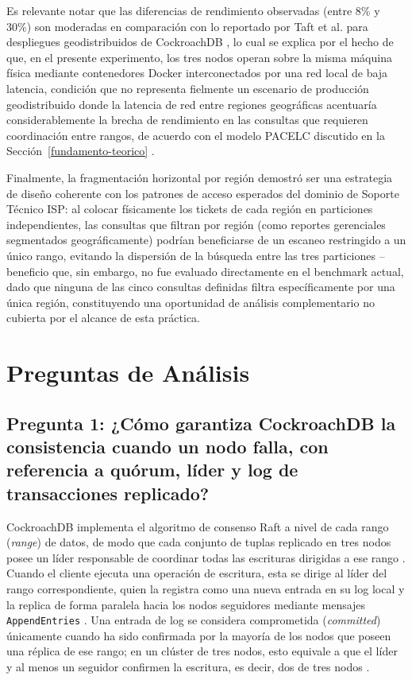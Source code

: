 \documentclass[12pt, a4paper]{article}
\begin{document}
Es relevante notar que las diferencias de rendimiento observadas (entre 8\% y 30\%) son moderadas en comparación con lo reportado por Taft et al. para despliegues geodistribuidos de CockroachDB \cite{taft2020cockroachdb}, lo cual se explica por el hecho de que, en el presente experimento, los tres nodos operan sobre la misma máquina física mediante contenedores Docker interconectados por una red local de baja latencia, condición que no representa fielmente un escenario de producción geodistribuido donde la latencia de red entre regiones geográficas acentuaría considerablemente la brecha de rendimiento en las consultas que requieren coordinación entre rangos, de acuerdo con el modelo PACELC discutido en la Sección~\ref{fundamento-teorico} \cite{abadi2012consistency}.

Finalmente, la fragmentación horizontal por región demostró ser una estrategia de diseño coherente con los patrones de acceso esperados del dominio de Soporte Técnico ISP: al colocar físicamente los tickets de cada región en particiones independientes, las consultas que filtran por región (como reportes gerenciales segmentados geográficamente) podrían beneficiarse de un escaneo restringido a un único rango, evitando la dispersión de la búsqueda entre las tres particiones -- beneficio que, sin embargo, no fue evaluado directamente en el benchmark actual, dado que ninguna de las cinco consultas definidas filtra específicamente por una única región, constituyendo una oportunidad de análisis complementario no cubierta por el alcance de esta práctica.

\section{Preguntas de Análisis}
\label{preguntas-analisis}

\subsection*{Pregunta 1: ¿Cómo garantiza CockroachDB la consistencia cuando un nodo falla, con referencia a quórum, líder y log de transacciones replicado?}

CockroachDB implementa el algoritmo de consenso Raft a nivel de cada rango (\textit{range}) de datos, de modo que cada conjunto de tuplas replicado en tres nodos posee un líder responsable de coordinar todas las escrituras dirigidas a ese rango \cite{ongaro2014raft}. Cuando el cliente ejecuta una operación de escritura, esta se dirige al líder del rango correspondiente, quien la registra como una nueva entrada en su log local y la replica de forma paralela hacia los nodos seguidores mediante mensajes \texttt{AppendEntries} \cite{ongaro2014raft}. Una entrada de log se considera comprometida (\textit{committed}) únicamente cuando ha sido confirmada por la mayoría de los nodos que poseen una réplica de ese rango; en un clúster de tres nodos, esto equivale a que el líder y al menos un seguidor confirmen la escritura, es decir, dos de tres nodos \cite{ongaro2014raft}.
\end{document}
